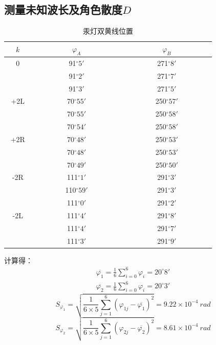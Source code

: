 \documentclass[a4paper,8pt,twocolumn]{article}
\begin{document}
 \subsection{测量未知波长及角色散度$D$}
  \begin{table}[h]
   \centering
   \begin{tabular}{|c|c|c|}
    \hline
    ~~$k$~~ & ~~~~~~~~~$\varphi_A$~~~~~~~~~ & ~~~~~~~~~$\varphi_B$~~~~~~~~~ \\ 
    \hline
     0  & ~~91$^\circ 5'$~~ & ~~271$^\circ 8'$~~ \\
        & 91$^\circ 2'$ & 271$^\circ 7'$ \\
        & 91$^\circ 3'$ & 271$^\circ 5'$ \\
    \hline
    +2L & 70$^\circ 55'$ & 250$^\circ 57'$ \\
        & 70$^\circ 55'$ & 250$^\circ 58'$ \\
        & 70$^\circ 54'$ & 250$^\circ 58'$ \\
    \hline
    +2R & 70$^\circ 48'$ & 250$^\circ 53'$ \\
        & 70$^\circ 48'$ & 250$^\circ 53'$ \\
        & 70$^\circ 49'$ & 250$^\circ 50'$ \\
    \hline
    -2R & 111$^\circ 1'$ & 291$^\circ 3'$ \\
        & 110$^\circ 59'$ & 291$^\circ 3'$ \\
        & 111$^\circ 0'$ & 291$^\circ 2'$ \\
    \hline
    -2L & 111$^\circ 4'$ & 291$^\circ 8'$ \\
        & 111$^\circ 4'$ & 291$^\circ 7'$ \\
        & 111$^\circ 3'$ & 291$^\circ 9'$ \\
    \hline
   \end{tabular}
   \caption{汞灯双黄线位置}
   \label{Date_2}
  \end{table}

  \noindent
  计算得：
  \begin{eqnarray}
    \overline{\varphi_1} = \frac{1}{6}\sum_{i = 0}^{6}\varphi_i = 20^\circ 8' \\
    \overline{\varphi_2} = \frac{1}{6}\sum_{i = 0}^{6}\varphi_i = 20^\circ 3'
  \end{eqnarray}
  \begin{equation}
    S_{\varphi_1} = \sqrt{\frac{1}{6\times5}\sum_{j = 1}^{6}(\varphi_{1j}-\overline{\varphi_1})^2} = 9.22\times10^{-4}~rad
  \end{equation}
  \begin{equation}
    S_{\varphi_2} = \sqrt{\frac{1}{6\times5}\sum_{j = 1}^{6}(\varphi_{2j}-\overline{\varphi_2})^2} = 8.61\times10^{-4}~rad
  \end{equation}
\end{document}
